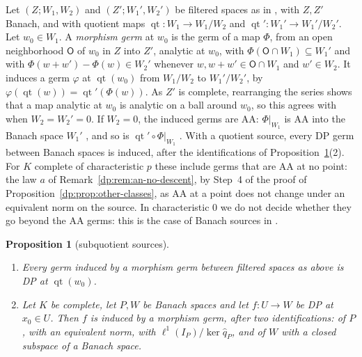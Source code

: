 \documentclass[11pt]{amsart}
\newtheorem{proposition}[theorem]{Proposition}
\theoremstyle{definition}
\theoremstyle{remark}
\numberwithin{equation}{section}
\theoremstyle{plain}
\theoremstyle{definition}
\theoremstyle{plain}
\begin{document}
Let $(Z;W_1,W_2)$ and $(Z';W_1',W_2')$ be filtered spaces as in \cite[Definition~14.1]{I}, with $Z,Z'$ Banach, and with quotient maps $\operatorname{qt}\colon W_1\to W_1/W_2$ and $\operatorname{qt}'\colon W_1'\to W_1'/W_2'$. Let $w_0\in W_1$. A \emph{morphism germ} at $w_0$ is the germ of a map $\Phi$, from an open neighborhood $\mathsf O$ of $w_0$ in $Z$ into $Z'$, analytic at $w_0$, with $\Phi(\mathsf O\cap W_1)\subseteq W_1'$ and with $\Phi(w+w')-\Phi(w)\in W_2'$ whenever $w,w+w'\in\mathsf O\cap W_1$ and $w'\in W_2$. It induces a germ $\varphi$ at $\operatorname{qt}(w_0)$ from $W_1/W_2$ to $W_1'/W_2'$, by $\varphi(\operatorname{qt}(w))=\operatorname{qt}'(\Phi(w))$. As $Z'$ is complete, rearranging the series shows that a map analytic at $w_0$ is analytic on a ball around $w_0$, so this agrees with \cite[Definition~14.25]{I} when $W_2=W_2'=0$. If $W_2=0$, the induced germs are AA: $\Phi|_{W_1}$ is AA into the Banach space $W_1'$ \cite[Remark~14.13]{I}, and so is $\operatorname{qt}'\circ\Phi|_{W_1}$ \cite[Proposition~14.12(1)]{I}. With a quotient source, every DP germ between Banach spaces is induced, after the identifications of Proposition~\ref{dp:prop:subquotients}(2). For $K$ complete of characteristic $p$ these include germs that are AA at no point: the law $a$ of Remark~\ref{dp:rem:an-no-descent}, by Step~4 of the proof of Proposition~\ref{dp:prop:other-classes}, as AA at a point does not change under an equivalent norm on the source. In characteristic $0$ we do not decide whether they go beyond the AA germs: this is the case of Banach sources in \cite[Question~14.42(1)]{I}.

\begin{proposition}[subquotient sources]\label{dp:prop:subquotients}
\leavevmode
\begin{enumerate}
\item Every germ induced by a morphism germ between filtered spaces as above is DP at $\operatorname{qt}(w_0)$.
\item Let $K$ be complete, let $P,W$ be Banach spaces and let $f\colon U\to W$ be DP at $x_0\in U$. Then $f$ is induced by a morphism germ, after two identifications: of $P$, with an equivalent norm, with $\ell^1(I_P)/\ker\hat q_P$, and of $W$ with a closed subspace of a Banach space.
\end{enumerate}
\end{proposition}
\end{document}
